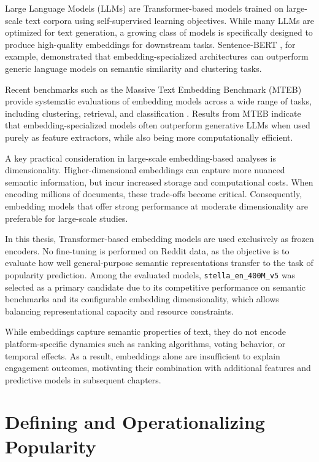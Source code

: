 Large Language Models (LLMs) are Transformer-based models trained on large-scale text corpora using self-supervised learning objectives. While many LLMs are optimized for text generation, a growing class of models is specifically designed to produce high-quality embeddings for downstream tasks. Sentence-BERT \cite{Reimers2019}, for example, demonstrated that embedding-specialized architectures can outperform generic language models on semantic similarity and clustering tasks.

Recent benchmarks such as the Massive Text Embedding Benchmark (MTEB)\cite{muennighoff2022mteb} provide systematic evaluations of embedding models across a wide range of tasks, including clustering, retrieval, and classification \cite{muennighoff2022mteb}. Results from MTEB indicate that embedding-specialized models often outperform generative LLMs when used purely as feature extractors, while also being more computationally efficient.

A key practical consideration in large-scale embedding-based analyses is dimensionality. Higher-dimensional embeddings can capture more nuanced semantic information, but incur increased storage and computational costs. When encoding millions of documents, these trade-offs become critical. Consequently, embedding models that offer strong performance at moderate dimensionality are preferable for large-scale studies.

In this thesis, Transformer-based embedding models are used exclusively as frozen encoders. No fine-tuning is performed on Reddit data, as the objective is to evaluate how well general-purpose semantic representations transfer to the task of popularity prediction. Among the evaluated models, \texttt{stella\_en\_400M\_v5} \cite{stella_en_400M_v5} was selected as a primary candidate due to its competitive performance on semantic benchmarks and its configurable embedding dimensionality, which allows balancing representational capacity and resource constraints.

While embeddings capture semantic properties of text, they do not encode platform-specific dynamics such as ranking algorithms, voting behavior, or temporal effects. As a result, embeddings alone are insufficient to explain engagement outcomes, motivating their combination with additional features and predictive models in subsequent chapters.

\section{Defining and Operationalizing Popularity}
\label{chap:defining_popularity}

